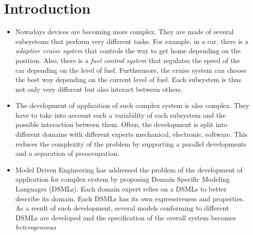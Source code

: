 \chapter{Introduction}


\begin{itemize}
	\item Nowadays devices are becoming more complex. They are made of several subsystems that perform very different tasks. For example, in a car, there is a \emph{adaptive cruise system} that controls the way to get home depending on the position. Also, there is a \emph{fuel control system} that regulates the speed of the car depending on the level of fuel. Furthermore, the cruise system can choose the best way depending on the current level of fuel. Each subsystem is thus not only very different but also interact between others.     
	
	
	\item The development of application of such complex system is also complex. They have to take into account such a variability of each subsystem and the possible interaction between them. Often, the development is split into different domains with different experts \eg mechanical, electronic, software. This reduces the complexity of the problem by supporting a parallel developments and a separation of preoccupation. 
	
	\item Model Driven Engineering has addressed the problem of the development of application for complex system by proposing Domain Specific Modeling Languages (DSMLs). Each domain expert relies on a DSMLs to better describe its domain. Each DSMLs has its own expressiveness and properties. As a result of such development, several models conforming to different DSMLs are developed and the specification of the overall system becomes \emph{heterogeneous}


\end{itemize}
